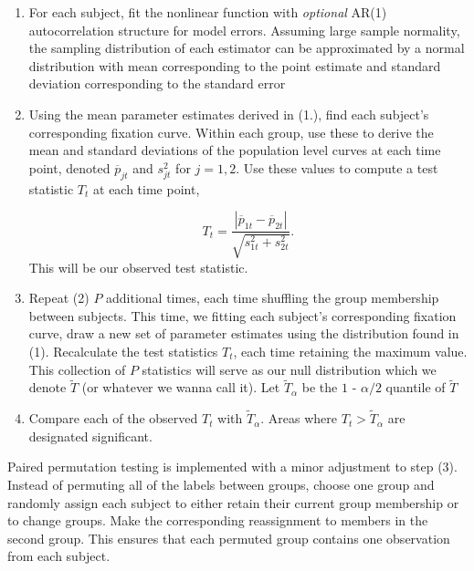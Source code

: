 \documentclass{article}
\begin{document}
\begin{singlespace}
\begin{enumerate}
\vspace{-2mm}
\item For each subject, fit the nonlinear function with \textit{optional} AR(1) autocorrelation structure for model errors. Assuming large sample normality, the sampling distribution of each estimator can be approximated by a normal distribution with mean corresponding to the point estimate and standard deviation corresponding to the standard error
\item Using the mean parameter estimates derived in (1.), find each subject's corresponding fixation curve. Within each group, use these to derive the mean and standard deviations of the population level curves at each time point, denoted $\overline{p}_{jt}$ and $s_{jt}^2$ for $j = 1,2$. Use these values to compute a test statistic $T_t$ at each time point,

\begin{equation}
T_t = \frac{|\overline{p}_{1t} - \overline{p}_{2t}|}{\sqrt{s_{1t}^2 + s_{2t}^2}}.
\end{equation}
This will be our observed test statistic.
\item Repeat (2) $P$  additional times, each time shuffling the group membership between subjects. This time, we fitting each subject's corresponding fixation curve, draw a new set of parameter estimates using the distribution found in (1). Recalculate the test statistics $T_t$, each time retaining the maximum value. This collection of $P$ statistics will serve as our null distribution which we denote $\widetilde{T}$ (or whatever we wanna call it). Let $\widetilde{T}_{\alpha}$ be the $1$ - $\alpha/2$ quantile of $\widetilde{T}$
\item Compare each of the observed $T_t$ with $\widetilde{T}_{\alpha}$. Areas where $T_t > \widetilde{T}_{\alpha}$ are designated significant. 
\end{enumerate}
\end{singlespace}

Paired permutation testing is implemented with a minor adjustment to step (3). Instead of permuting all of the labels between groups, choose one group and randomly assign each subject to either retain their current group membership or to change groups. Make the corresponding reassignment to members in the second group. This ensures that each permuted group contains one observation from each subject.
\end{document}
